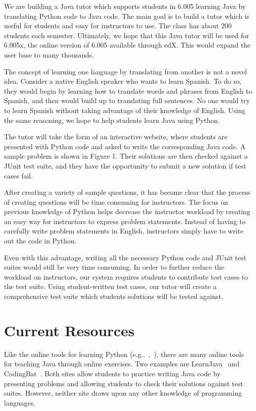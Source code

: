 \documentclass{sigchi}
\begin{document}
We are building a Java tutor which supports students in 6.005 learning Java by translating Python code to Java code. The main goal is to build a tutor which is useful for students and easy for instructors to use. The class has about 200 students each semester. Ultimately, we hope that this Java tutor will be used for 6.005x, the online version of 6.005 available through edX. This would expand the user base to many thousands.

The concept of learning one language by translating from another is not a novel idea. Consider a native English speaker who wants to learn Spanish. To do so, they would begin by learning how to translate words and phrases from English to Spanish, and then would build up to translating full sentences. No one would try to learn Spanish without taking advantage of their knowledge of English. Using the same reasoning, we hope to help students learn Java using Python.

The tutor will take the form of an interactive website, where students are presented with Python code and asked to write the corresponding Java code. A sample problem is shown in Figure 1. Their solutions are then checked against a JUnit test suite, and they have the opportunity to submit a new solution if test cases fail.


After creating a variety of sample questions, it has become clear that the process of creating questions will be time consuming for instructors. The focus on previous knowledge of Python helps decrease the instructor workload by creating an easy way for instructors to express problem statements. Instead of having to carefully write problem statements in English, instructors simply have to write out the code in Python.

Even with this advantage, writing all the necessary Python code and JUnit test suites would still be very time consuming. In order to further reduce the workload on instructors, our system requires students to contribute test cases to the test suite. Using student-written test cases, our tutor will create a comprehensive test suite which students solutions will be tested against.

\section{Current Resources}

Like the online tools for learning Python (e.g.,~\cite{pythontutor},~\cite{philip}), there are many online tools for teaching Java through online exercises. Two examples are LearnJava~\cite{learnjava} and CodingBat~\cite{codingbat}. Both sites allow students to practice writing Java code by presenting problems and allowing students to check their solutions against test suites. However, neither site draws upon any other knowledge of programming languages.
\end{document}
